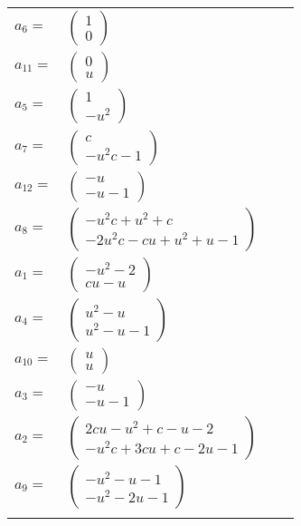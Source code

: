 \documentclass[1p]{elsarticle_modified}
\theoremstyle{definition}
\begin{document}
\begin{tabular}{m{7pt} m{180pt} m{7pt} m{180pt} }
\flushright $a_{6}=$&$\begin{pmatrix}1\\0\end{pmatrix}$ \\
\flushright $a_{11}=$&$\begin{pmatrix}0\\u\end{pmatrix}$ \\
\flushright $a_{5}=$&$\begin{pmatrix}1\\- u^2\end{pmatrix}$ \\
\flushright $a_{7}=$&$\begin{pmatrix}c\\- u^2 c-1\end{pmatrix}$ \\
\flushright $a_{12}=$&$\begin{pmatrix}- u\\- u-1\end{pmatrix}$ \\
\flushright $a_{8}=$&$\begin{pmatrix}- u^2 c+u^2+c\\-2 u^2 c- c u+u^2+u-1\end{pmatrix}$ \\
\flushright $a_{1}=$&$\begin{pmatrix}- u^2-2\\c u- u\end{pmatrix}$ \\
\flushright $a_{4}=$&$\begin{pmatrix}u^2- u\\u^2- u-1\end{pmatrix}$ \\
\flushright $a_{10}=$&$\begin{pmatrix}u\\u\end{pmatrix}$ \\
\flushright $a_{3}=$&$\begin{pmatrix}- u\\- u-1\end{pmatrix}$ \\
\flushright $a_{2}=$&$\begin{pmatrix}2 c u- u^2+c- u-2\\- u^2 c+3 c u+c-2 u-1\end{pmatrix}$ \\
\flushright $a_{9}=$&$\begin{pmatrix}- u^2- u-1\\- u^2-2 u-1\end{pmatrix}$\\&\end{tabular}
\end{document}
